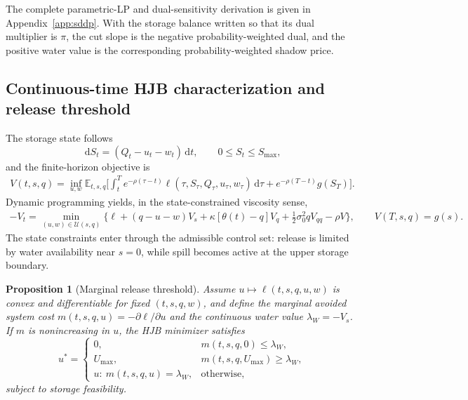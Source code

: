 \documentclass[11pt,a4paper]{article}
\newcommand{\E}{\mathbb{E}}
\newcommand{\dif}{\,\mathrm{d}}
\newtheorem{proposition}{Proposition}
\begin{document}
\noindent The complete parametric-LP and dual-sensitivity derivation is given in
Appendix~\ref{app:sddp}. With the storage balance written so that its dual
multiplier is $\pi$, the cut slope is the negative probability-weighted dual,
and the positive water value is the corresponding probability-weighted shadow
price.

\subsection{Continuous-time HJB characterization and release threshold}\label{sec:hjb}
The storage state follows
\begin{equation}
 \dif S_t=(Q_t-u_t-w_t)\dif t,\qquad 0\le S_t\le S_{\max},
 \label{eq:storage-sde}
\end{equation}
and the finite-horizon objective is
\begin{multline}
 V(t,s,q)=\inf_{u,w}\E_{t,s,q}\Bigg[
 \int_t^T e^{-\rho(\tau-t)}
 \ell(\tau,S_\tau,Q_\tau,u_\tau,w_\tau)\dif\tau +e^{-\rho(T-t)}g(S_T)\Bigg].
 \label{eq:objective}
\end{multline}
Dynamic programming yields, in the state-constrained viscosity sense,
\begin{multline}
 -V_t=\min_{(u,w)\in\mathcal U(s,q)}\Big\{
 \ell+(q-u-w)V_s+\kappa[\theta(t)-q]V_q +\tfrac12\sigma_0^2 qV_{qq}-\rho V\Big\},
 \qquad V(T,s,q)=g(s).
 \label{eq:hjb}
\end{multline}
The state constraints enter through the admissible control set: release is
limited by water availability near $s=0$, while spill becomes active at the upper
storage boundary.

\begin{proposition}[Marginal release threshold]\label{prop:threshold}
Assume $u\mapsto\ell(t,s,q,u,w)$ is convex and differentiable for fixed
$(t,s,q,w)$, and define the marginal avoided system cost
$m(t,s,q,u)=-\partial\ell/\partial u$ and the continuous water value
$\lambda_W=-V_s$. If $m$ is nonincreasing in $u$, the HJB minimizer satisfies
\begin{equation}
 u^*=\begin{cases}
 0, & m(t,s,q,0)\le\lambda_W,\\
 U_{\max}, & m(t,s,q,U_{\max})\ge\lambda_W,\\
 u:\ m(t,s,q,u)=\lambda_W, & \text{otherwise},
 \end{cases}
 \label{eq:threshold}
\end{equation}
subject to storage feasibility.
\end{proposition}
\end{document}

